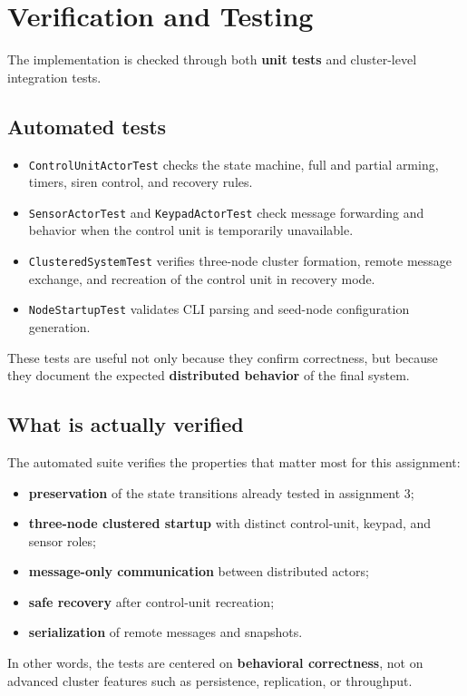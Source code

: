 \clearpage
\section{Verification and Testing}

The implementation is checked through both \textbf{unit tests} and cluster-level
integration tests.

\subsection{Automated tests}

\begin{itemize}
    \item \texttt{ControlUnitActorTest} checks the state machine, full and partial arming, timers, siren control, and recovery rules.
    \item \texttt{SensorActorTest} and \texttt{KeypadActorTest} check message forwarding and behavior when the control unit is temporarily unavailable.
    \item \texttt{ClusteredSystemTest} verifies three-node cluster formation, remote message exchange, and recreation of the control unit in recovery mode.
    \item \texttt{NodeStartupTest} validates CLI parsing and seed-node configuration generation.
\end{itemize}

These tests are useful not only because they confirm correctness, but because
they document the expected \textbf{distributed behavior} of the final system.

\subsection{What is actually verified}

The automated suite verifies the properties that matter most for this
assignment:

\begin{itemize}
    \item \textbf{preservation} of the state transitions already tested in assignment 3;
    \item \textbf{three-node clustered startup} with distinct control-unit, keypad, and sensor roles;
    \item \textbf{message-only communication} between distributed actors;
    \item \textbf{safe recovery} after control-unit recreation;
    \item \textbf{serialization} of remote messages and snapshots.
\end{itemize}

In other words, the tests are centered on \textbf{behavioral correctness}, not on
advanced cluster features such as persistence, replication, or throughput.
